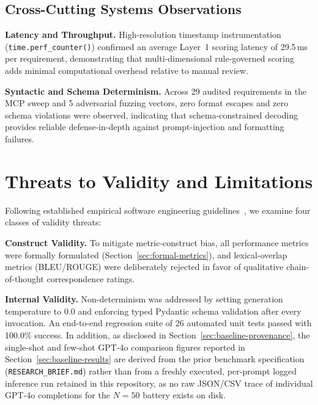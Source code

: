 \documentclass[journal]{IEEEtran}
\begin{document}
\subsection{Cross-Cutting Systems Observations}
\label{sec:discussion-crosscutting}

\textbf{Latency and Throughput.} High-resolution timestamp instrumentation (\texttt{time.perf\_counter()}) confirmed an average Layer~1 scoring latency of 29.5\,ms per requirement, demonstrating that multi-dimensional rule-governed scoring adds minimal computational overhead relative to manual review.

\textbf{Syntactic and Schema Determinism.} Across 29 audited requirements in the MCP sweep and 5 adversarial fuzzing vectors, zero format escapes and zero schema violations were observed, indicating that schema-constrained decoding provides reliable defense-in-depth against prompt-injection and formatting failures.

\section{Threats to Validity and Limitations}
\label{sec:threats}

Following established empirical software engineering guidelines~\cite{wohlin2012experimentation}, we examine four classes of validity threats:

\textbf{Construct Validity.} To mitigate metric-construct bias, all performance metrics were formally formulated (Section~\ref{sec:formal-metrics}), and lexical-overlap metrics (BLEU/ROUGE) were deliberately rejected in favor of qualitative chain-of-thought correspondence ratings.

\textbf{Internal Validity.} Non-determinism was addressed by setting generation temperature to $0.0$ and enforcing typed Pydantic schema validation after every invocation. An end-to-end regression suite of 26 automated unit tests passed with 100.0\% success. In addition, as disclosed in Section~\ref{sec:baseline-provenance}, the single-shot and few-shot GPT-4o comparison figures reported in Section~\ref{sec:baseline-results} are derived from the prior benchmark specification (\texttt{RESEARCH\_BRIEF.md}) rather than from a freshly executed, per-prompt logged inference run retained in this repository, as no raw JSON/CSV trace of individual GPT-4o completions for the $N=50$ battery exists on disk.
\end{document}
